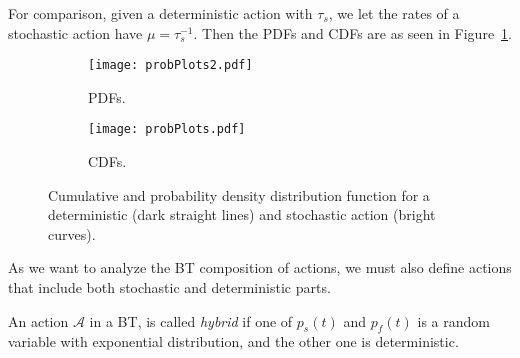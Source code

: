 \begin{example}
 For comparison, given a deterministic action with $\tau_s$, we let the rates of a stochastic action have $\mu=\tau_s^{-1}$. Then the PDFs and CDFs are as seen in 
Figure~\ref{stoch:DE.fig.prob}.
\end{example}
%
\begin{figure}[h]
\centering
\begin{subfigure}[h]{0.8\columnwidth}
\texttt{[image: probPlots2.pdf]}
\caption{PDFs.}
\end{subfigure}
\begin{subfigure}[h]{0.8\columnwidth}
\texttt{[image: probPlots.pdf]}
\caption{CDFs.}
\end{subfigure}
\caption{Cumulative and probability density distribution function for a deterministic (dark straight lines) and stochastic action (bright curves).}
\label{stoch:DE.fig.prob}
\end{figure} 


As we want to analyze the BT composition of actions, we must also define actions that include both stochastic and deterministic parts.

\begin{definition}
\label{stoch:def:hyb}
An action $\mathcal{A}$ in a BT, is called \emph{hybrid} if one of $p_s(t)$ and $p_f(t)$ is a random variable with exponential distribution, and the other one is deterministic.
\end{definition}

